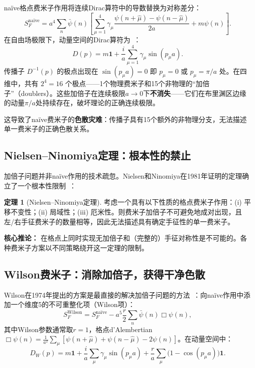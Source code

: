 \documentclass[12pt,a4paper]{ctexart}
\theoremstyle{definition}
\newtheorem{theorem}{定理}[section]
\begin{document}
na\"ive格点费米子作用将连续Dirac算符中的导数替换为对称差分：
\begin{equation}
    S_F^{\text{na\"ive}} = a^4\sum_n \bar{\psi}(n)\left[ \sum_{\mu=1}^4 \gamma_\mu \frac{\psi(n+\hat{\mu}) - \psi(n-\hat{\mu})}{2a} + m\psi(n) \right].
\end{equation}
在自由场极限下，动量空间的Dirac算符为~\cite{GattringerLang2010}：
\begin{equation}
    D(p) = m\mathbf{1} + \frac{i}{a}\sum_{\mu=1}^4 \gamma_\mu \sin(p_\mu a).
\end{equation}
传播子 $D^{-1}(p)$ 的极点出现在 $\sin(p_\mu a) = 0$ 即 $p_\mu = 0$ 或 $p_\mu = \pi/a$ 处。在四维中，共有 $2^4 = 16$ 个极点——1个物理费米子和15个非物理的``加倍子''（doublers）。这些加倍子在连续极限$a \to 0$下\textbf{不消失}——它们在布里渊区边缘的动量$\pi/a$处持续存在，破坏理论的正确连续极限。

这导致了na\"ive费米子的\textbf{色散灾难}：传播子具有15个额外的非物理分支，无法描述单一费米子的正确色散关系。

\subsection{Nielsen--Ninomiya定理：根本性的禁止}

加倍子问题并非na\"ive作用的技术疏忽。Nielsen和Ninomiya在1981年证明的定理确立了一个根本性限制~\cite{GattringerLang2010}：

\begin{theorem}[Nielsen--Ninomiya定理]\label{thm:NN}
考虑一个具有以下性质的格点费米子作用：(i) 平移不变性；(ii) 局域性；(iii) 厄米性。则费米子加倍子不可避免地成对出现，且左/右手征费米子的数量相等，因此无法描述具有确定手征性的单一费米子。
\end{theorem}

\textbf{核心推论：} 在格点上同时实现无加倍子和（完整的）手征对称性是不可能的。各种费米子方案以不同策略绕开这一定理的限制。

\subsection{Wilson费米子：消除加倍子，获得干净色散}

Wilson在1974年提出的方案是最直接的解决加倍子问题的方法~\cite{GattringerLang2010,fermionFormulations2026}：向na\"ive作用中添加一个维度5的不可重整化项（Wilson项）：
\begin{equation}
    S_F^{\text{Wilson}} = S_F^{\text{na\"ive}} - a^5 \frac{r}{2} \sum_n \bar{\psi}(n)\Box\psi(n),
\end{equation}
其中Wilson参数通常取$r=1$，格点d'Alembertian $\Box\psi(n) = \frac{1}{a^2}\sum_\mu[\psi(n+\hat{\mu}) + \psi(n-\hat{\mu}) - 2\psi(n)]$。在动量空间中：
\begin{equation}
    D_W(p) = m\mathbf{1} + \frac{i}{a}\sum_{\mu} \gamma_\mu \sin(p_\mu a) + \frac{r}{a}\sum_{\mu} \bigl(1 - \cos(p_\mu a)\bigr)\mathbf{1}.
\end{equation}
\end{document}
